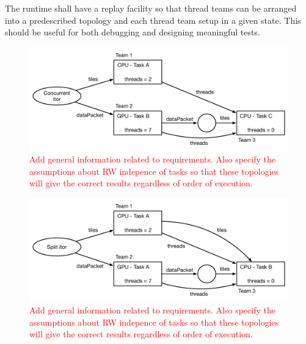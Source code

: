 \documentclass{article}
\begin{document}
\begin{req}
The runtime shall have a replay facility so that thread teams can be arranged
into a predescribed topology and each thread team setup in a given state.  This
should be useful for both debugging and designing meaningful tests.
\end{req}

\begin{figure}[!ht]
\begin{center}
\includegraphics[width=5.0in]{ConcurrentItorExample.pdf}
\caption[]{\textcolor{red}{Add general information related to requirements.
Also specify the assumptions about RW indepence of tasks so that these
topologies will give the correct results regardless of order of execution.}}
\label{fig:ConcurrentItor}
\end{center}
\end{figure}

\begin{figure}[!ht]
\begin{center}
\includegraphics[width=5.0in]{WorkSplittingExample.pdf}
\caption[]{\textcolor{red}{Add general information related to requirements.
Also specify the assumptions about RW indepence of tasks so that these
topologies will give the correct results regardless of order of execution.}}
\label{fig:SplitItor}
\end{center}
\end{figure}
\end{document}

